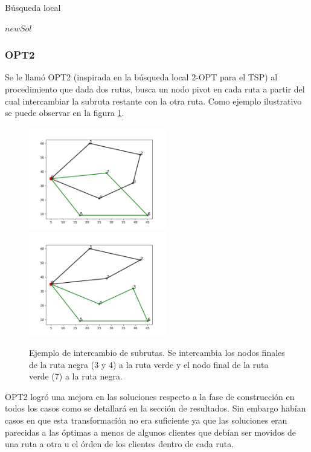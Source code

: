 \documentclass{article}
\begin{document}
  \begin{algorithm}
    \caption{Búsqueda local}
    \label{localsearch}
    \begin{algorithmic}
        \State \Return $newSol$
      \EndFunction
    \end{algorithmic}
  \end{algorithm}

  \subsubsection*{OPT2}

  Se le llamó OPT2 (inspirada en la búsqueda local 2-OPT para el TSP) al procedimiento que dada dos rutas, busca un nodo pivot en cada ruta a partir del cual intercambiar la subruta restante con la otra ruta. Como ejemplo ilustrativo se puede observar en la figura \ref{opt2example}.
  
  \begin{figure}
    \centering
    \includegraphics[width=6cm]{resources/opt2/before.png}
    \includegraphics[width=6cm]{resources/opt2/after.png}
    \caption{Ejemplo de intercambio de subrutas. Se intercambia los nodos finales de la ruta negra (3 y 4) a la ruta verde y el nodo final de la ruta verde (7) a la ruta negra.}
    \label{opt2example}
  \end{figure}

  OPT2 logró una mejora en las soluciones respecto a la fase de construcción en todos los casos como se detallará en la sección de resultados. Sin embargo habían casos en que esta transformación no era suficiente ya que las soluciones eran parecidas a las óptimas a menos de algunos clientes que debían ser movidos de una ruta a otra u el órden de los clientes dentro de cada ruta.
\end{document}
